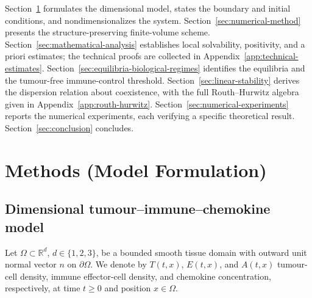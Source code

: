 \documentclass[a4paper,fleqn,longmktitle]{cas-sc}
\theoremstyle{plain}
\theoremstyle{definition}
\numberwithin{equation}{section}
\begin{document}
Section~\ref{sec:model-formulation} formulates the dimensional model, states the
boundary and initial conditions, and nondimensionalizes the system.
Section~\ref{sec:numerical-method} presents the structure-preserving
finite-volume scheme.
Section~\ref{sec:mathematical-analysis} establishes local solvability,
positivity, and a priori estimates; the technical proofs are collected in
Appendix~\ref{app:technical-estimates}.
Section~\ref{sec:equilibria-biological-regimes} identifies the equilibria and the
tumour-free immune-control threshold.
Section~\ref{sec:linear-stability} derives the dispersion relation about
coexistence, with the full Routh--Hurwitz algebra given in
Appendix~\ref{app:routh-hurwitz}.
Section~\ref{sec:numerical-experiments} reports the
numerical experiments, each verifying a specific theoretical result.
Section~\ref{sec:conclusion} concludes.

\section{Methods (Model Formulation)}\label{sec:model-formulation}

\subsection{Dimensional tumour--immune--chemokine model}
\label{subsec:dimensional-model}

Let $\Omega\subset\mathbb R^d$, $d\in\{1,2,3\}$, be a bounded smooth tissue
domain with outward unit normal vector $n$ on $\partial\Omega$. We denote by
$T(t,x)$, $E(t,x)$, and $A(t,x)$ tumour-cell density, immune effector-cell density,
and chemokine concentration, respectively, at time $t\ge0$ and position $x\in\Omega$.
\end{document}
